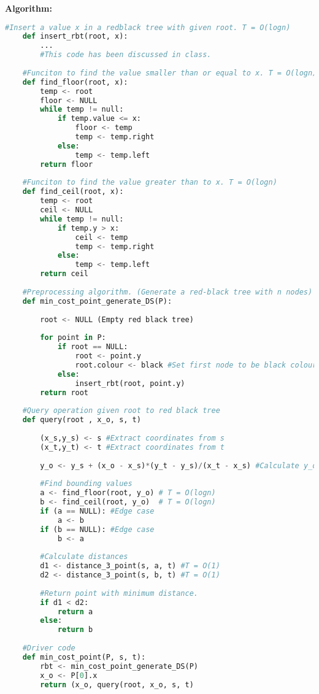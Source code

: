 \documentclass[10pt, a4paper]{article}
\begin{document}
\textbf{Algorithm:}
\begin{lstlisting}[language=Python,caption= Min Cost Point]
    #Insert a value x in a redblack tree with given root. T = O(logn)
    def insert_rbt(root, x):
        ...
        #This code has been discussed in class.
    
    #Funciton to find the value smaller than or equal to x. T = O(logn)
    def find_floor(root, x):
        temp <- root 
        floor <- NULL
        while temp != null: 
            if temp.value <= x: 
                floor <- temp 
                temp <- temp.right 
            else: 
                temp <- temp.left 
        return floor
    
    #Funciton to find the value greater than to x. T = O(logn)
    def find_ceil(root, x): 
        temp <- root 
        ceil <- NULL
        while temp != null: 
            if temp.y > x: 
                ceil <- temp 
                temp <- temp.right 
            else: 
                temp <- temp.left 
        return ceil
    
    #Preprocessing algorithm. (Generate a red-black tree with n nodes) T = O(nlogn)
    def min_cost_point_generate_DS(P):
        
        root <- NULL (Empty red black tree)
        
        for point in P:
            if root == NULL:
                root <- point.y
                root.colour <- black #Set first node to be black colour
            else:
                insert_rbt(root, point.y)
        return root
    
    #Query operation given root to red black tree
    def query(root , x_o, s, t)
    
        (x_s,y_s) <- s #Extract coordinates from s
        (x_t,y_t) <- t #Extract coordinates from t
        
        y_o <- y_s + (x_o - x_s)*(y_t - y_s)/(x_t - x_s) #Calculate y_o
        
        #Find bounding values
        a <- find_floor(root, y_o) # T = O(logn)
        b <- find_ceil(root, y_o)  # T = O(logn)
        if (a == NULL): #Edge case
            a <- b
        if (b == NULL): #Edge case
            b <- a
        
        #Calculate distances
        d1 <- distance_3_point(s, a, t) #T = O(1)
        d2 <- distance_3_point(s, b, t) #T = O(1)
        
        #Return point with minimum distance.
        if d1 < d2:
            return a
        else:
            return b
    
    #Driver code
    def min_cost_point(P, s, t):
        rbt <- min_cost_point_generate_DS(P)
        x_o <- P[0].x
        return (x_o, query(root, x_o, s, t)
\end{lstlisting}
\end{document}
